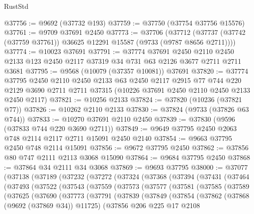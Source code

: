 \begin{lexlean}{RustStd}
\begin{coremodule}
@37756 := @9692 (@37732 @193)
@37759 := @37750 (@37754 @37756 @15576)
@37761 := @9709 @37691 @2450
@37773 := @37706
    (@37712 (@37737 (@37742 (@37759 @37761)) @36625 @12291 @15587 (@9733 (@9787 @8656 @2711))))
@37774 := @10023 @37691
@37791 := @37774
    @37691
    @2450
    @2110
    @2450
    @2133
    @123
    @2450
    @2117
    @37319
    @34
    @731
    @63
    @2126
    @3677
    @2711
    @2711
    @3681
@37795 := @9568 (@10079 (@37357 @10081)) @37691
@37820 := @37774
    @37795
    @2450
    @2110
    @2450
    @2133
    @63
    @2450
    @2117
    @2915
    @77
    @744
    @220
    @2129
    @3690
    @2711
    @2711
    @37315
    (@10226 @37691 @2450 @2110 @2450 @2133 @2450 @2117)
@37821 := @10256 @2133
@37824 := @37820 (@10236 (@37821 @77))
@37826 := @10262 @2110 @2133
@37830 := @37824 (@9733 (@37826 @63 @744))
@37833 := @10270 @37691 @2110 @2450
@37839 := @37830 (@9596 (@37833 @744 @220 @3690 @2711))
@37849 := @9649 @37795 @2450 @2063 @748 @2114 @2117 @2711 @15091 @2450 @2140
@37854 := @9663 @37795 @2450 @748 @2114 @15091
@37856 := @9672 @37795 @2450
@37862 := @37856 @80 @747 @2111 @2113 @3068 @15090
@37864 := @9684 @37795 @2450
@37868 := @37864 @34 @2111 @34 @3068
@37869 := @9693 @37795
@38000 := @37077
    (@37138
      (@37189
        (@37232
          (@37272
            (@37324
              (@37368
                (@37394
                  (@37431
                    (@37464
                      (@37493
                        (@37522
                          (@37543
                            (@37559
                              (@37573
                                (@37577
                                  (@37581
                                    (@37585
                                      (@37589
                                        (@37625
                                          (@37690
                                            (@37773
                                              (@37791
                                                (@37839
                                                  (@37849
                                                    (@37854
                                                      (@37862
                                                        (@37868 (@9692 (@37869 @34)) @11725)
                                                        (@37856
                                                          @206
                                                          @225
                                                          @17
                                                          @2108

\end{coremodule}
\end{lexlean}
